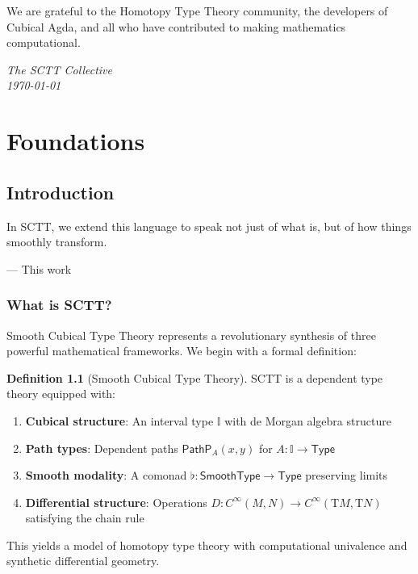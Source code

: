 \documentclass[12pt,openright,twoside]{book}
\theoremstyle{plain}
\theoremstyle{definition}
\newtheorem{definition}[theorem]{Definition}
\theoremstyle{remark}
\newcommand{\Type}{\mathsf{Type}}
\newcommand{\PathP}[3]{\mathsf{PathP}_{#1}(#2,#3)}
\newcommand{\Cinfty}{C^\infty}
\newcommand{\TM}{\mathrm{T}M}
\newcommand{\I}{\mathbb{I}}
\begin{document}
We are grateful to the Homotopy Type Theory community, the developers of Cubical Agda, and all who have contributed to making mathematics computational.

\vspace{1cm}
\noindent\textit{The SCTT Collective}\\
\textit{\today}

\mainmatter

\part{Foundations}

\chapter{Introduction}
\label{ch:introduction}

\epigraph{In SCTT, we extend this language to speak not just of what is, but of how things smoothly transform.}{--- This work}

\section{What is SCTT?}
\label{sec:what-is-sctt}

Smooth Cubical Type Theory represents a revolutionary synthesis of three powerful mathematical frameworks. We begin with a formal definition:

\begin{definition}[Smooth Cubical Type Theory]
\label{def:sctt}
SCTT is a dependent type theory equipped with:
\begin{enumerate}
\item \textbf{Cubical structure}: An interval type $\I$ with de Morgan algebra structure
\item \textbf{Path types}: Dependent paths $\PathP{A}{x}{y}$ for $A : \I \to \Type$
\item \textbf{Smooth modality}: A comonad $\flat : \mathsf{SmoothType} \to \Type$ preserving limits
\item \textbf{Differential structure}: Operations $D : \Cinfty(M,N) \to \Cinfty(\TM,\mathrm{T}N)$ satisfying the chain rule
\end{enumerate}
This yields a model of homotopy type theory with computational univalence and synthetic differential geometry.
\end{definition}
\end{document}
